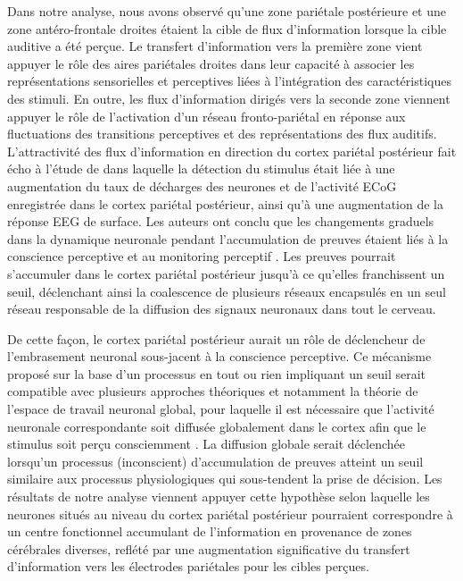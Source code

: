 Dans notre analyse, nous avons observé qu'une zone pariétale postérieure et une zone antéro-frontale droites étaient la cible de flux d'information lorsque la cible auditive a été perçue. 
Le transfert d’information vers la première zone vient appuyer le rôle des aires pariétales droites dans leur capacité à associer les représentations sensorielles et perceptives liées à l’intégration des caractéristiques des stimuli. 
En outre, les flux d'information dirigés vers la seconde zone viennent appuyer le rôle de l'activation d'un réseau fronto-pariétal en réponse aux fluctuations des transitions perceptives et des représentations des flux auditifs.
L'attractivité des flux d'information en direction du cortex pariétal postérieur fait écho à l'étude de \cite{pereira2021evidence} dans laquelle la détection du stimulus était liée à une augmentation du taux de décharges des neurones et de l'activité ECoG enregistrée dans le cortex pariétal postérieur, ainsi qu'à une augmentation de la réponse EEG de surface. 
Les auteurs ont conclu que les changements graduels dans la dynamique neuronale pendant l'accumulation de preuves étaient liés à la conscience perceptive et au monitoring perceptif \citep{pereira2021evidence}.
Les preuves pourrait s'accumuler dans le cortex pariétal postérieur jusqu'à ce qu'elles franchissent un seuil, déclenchant ainsi la coalescence de plusieurs réseaux encapsulés en un seul réseau responsable de la diffusion des signaux neuronaux dans tout le cerveau.

De cette façon, le cortex pariétal postérieur aurait un rôle de déclencheur de l'embrasement neuronal sous-jacent à la conscience perceptive. 
Ce mécanisme proposé sur la base d'un processus en tout ou rien impliquant un seuil serait compatible avec plusieurs approches théoriques \citep{windey2015consciousness} et notamment la théorie de l'espace de travail neuronal global, pour laquelle il est nécessaire que l'activité neuronale correspondante soit diffusée globalement dans le cortex afin que le stimulus soit perçu consciemment \citep{mashour2020conscious}. 
La diffusion globale serait déclenchée lorsqu'un processus (inconscient) d'accumulation de preuves atteint un seuil similaire aux processus physiologiques qui sous-tendent la prise de décision. 
Les résultats de notre analyse viennent appuyer cette hypothèse selon laquelle les neurones situés au niveau du cortex pariétal postérieur pourraient correspondre à un centre fonctionnel accumulant de l'information en provenance de zones cérébrales diverses, reflété par une augmentation significative du transfert d'information vers les électrodes pariétales pour les cibles perçues. 


